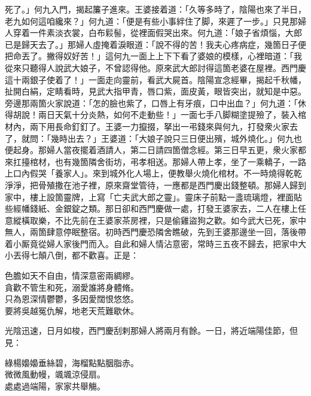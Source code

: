 死了。」何九入門，揭起簾子進來。王婆接着道：「久等多時了，陰陽也來了半日，老九如何這咱纔來？」何九道：「便是有些小事絆住了脚，來遲了一步。」只見那婦人穿着一件素淡衣裳，白布鬏髻，從裡面假哭出來。何九道：「娘子省煩惱，大郎已是歸天去了。」那婦人虛掩着淚眼道：「說不得的苦！我夫心疼病症，幾箇日子便把命丟了。撇得奴好苦！」這何九一面上上下下看了婆娘的模樣，心裡暗道：「我從來只聽得人說武大娘子，不曾認得他。原來武大郎討得這箇老婆在屋裡。西門慶這十兩銀子使着了！」一面走向靈前，看武大屍首。陰陽宣念經畢，揭起千秋幡，扯開白絹，定睛看時，見武大指甲青，唇口紫，面皮黃，眼皆突出，就知是中惡。旁邊那兩箇火家說道：「怎的臉也紫了，口唇上有牙痕，口中出血？」何九道：「休得胡說！兩日天氣十分炎熱，如何不走動些！」一面七手八脚糊塗提殮了，裝入棺材內，兩下用長命釘釘了。王婆一力攛掇，拏出一弔錢來與何九，打發衆火家去了，就問：「幾時出去？」王婆道：「大娘子說只三日便出殯，城外燒化。」何九也便起身。那婦人當夜擺着酒請人，第二日請四箇僧念經。第三日早五更，衆火家都來扛擡棺材，也有幾箇隣舍街坊，弔孝相送。那婦人帶上孝，坐了一乘轎子，一路上口內假哭「養家人」。來到城外化人場上，便教舉火燒化棺材。不一時燒得乾乾淨淨，把骨殖撒在池子裡，原來齋堂管待，一應都是西門慶出錢整頓。那婦人歸到家中，樓上設箇靈牌，上寫「亡夫武大郎之靈」。{}靈床子前點一盞琉璃燈，裡面貼些經幡錢紙、金銀錠之類。那日卻和西門慶做一處，打發王婆家去，二人在樓上任意縱橫取樂，不比先前在王婆家茶房裡，只是偷雞盜狗之歡。如今武大已死，家中無人，兩箇肆意停眠整宿。初時西門慶恐隣舍瞧破，先到王婆那邊坐一回，落後帶着小厮竟從婦人家後門而入。自此和婦人情沾意密，常時三五夜不歸去，把家中大小丟得七顛八倒，都不歡喜。正是：

\begin{myquote} 
色膽如天不自由，情深意密兩綢繆。\\貪歡不管生和死，溺愛誰將身體脩。\\只為恩深情鬱鬱，多因愛闊恨悠悠。\\要將吳越冤仇解，地老天荒難歇休。
\end{myquote} 

光陰迅速，日月如梭，西門慶刮剌那婦人將兩月有餘。一日，將近端陽佳節，但見：

\begin{myquote} 
綠楊嬝嬝垂絲碧，海榴點點胭脂赤。\\微微風動幔，颯颯涼侵扇。\\處處過端陽，家家共舉觴。
\end{myquote} 


